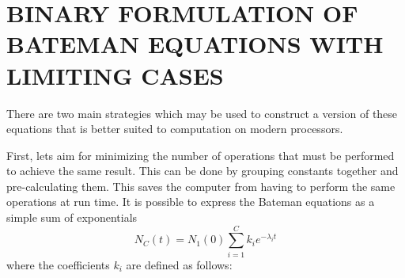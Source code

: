\documentclass[letterpaper]{physor2018}
\begin{document}
\section{BINARY FORMULATION OF BATEMAN EQUATIONS WITH LIMITING CASES}
\label{sec-binary}
There are two main strategies which may be used to construct a version of these equations that
is better suited to computation on modern processors.

First, lets aim for minimizing the number of
operations that must be performed to achieve the same result. This can be done
by grouping constants together and pre-calculating them. This saves the computer from
having to perform the same operations at run time.  It is possible to express the
Bateman equations as a simple sum of exponentials
\begin{equation}
\label{sum-of-exp}
    N_C(t) = N_1(0) \sum_{i=1}^C k_{i} e^{-\lambda_i t}
\end{equation}
where the coefficients $k_i$ are defined as follows:
\end{document}
